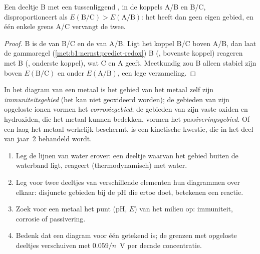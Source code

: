 \begin{proposition}\label{prop:b1:e-ph-diagrams:disproportionation-criterion}
Een deeltje B met een tussenliggend , in de koppels A/B en
B/C, disproportioneert als $E(\mathrm{B}/\mathrm{C}) > E(\mathrm{A}/\mathrm{B})$:
het heeft dan geen eigen gebied, en één enkele grens A/C vervangt de
twee.
\end{proposition}

\begin{proof}
B is de  van B/C en de  van A/B. Ligt het koppel B/C
boven A/B, dan laat de gammaregel (\cref{met:b1:nernst:predict-redox}) B
(, bovenste koppel) reageren met B (, onderste koppel),
wat C en A geeft. Meetkundig zou B alleen stabiel zijn boven
$E(\mathrm{B}/\mathrm{C})$ en onder $E(\mathrm{A}/\mathrm{B})$, een lege
verzameling.
\end{proof}

\begin{definition}\label{def:b1:e-ph-diagrams:corrosion-domains}
In het diagram van een metaal is het gebied van het metaal zelf zijn
\emph{immuniteitsgebied} (het kan niet
geoxideerd worden); de gebieden van zijn opgeloste ionen vormen het
\emph{corrosiegebied}; de gebieden van zijn vaste
oxiden en hydroxiden, die het metaal kunnen bedekken, vormen het
\emph{passiveringsgebied}. Of een laag het
metaal werkelijk beschermt, is een kinetische kwestie, die in het deel
van jaar~2 behandeld wordt.
\end{definition}

\begin{method}\label{met:b1:e-ph-diagrams:read}
\begin{enumerate}
  \item Leg de lijnen van water erover: een deeltje waarvan het gebied
        buiten de waterband ligt, reageert (thermodynamisch) met water.
  \item Leg voor twee deeltjes van verschillende elementen hun diagrammen
        over elkaar: disjuncte gebieden bij de pH die ertoe doet,
        betekenen een reactie.
  \item Zoek voor een metaal het punt (pH, $E$) van het milieu op:
        immuniteit, corrosie of passivering.
  \item Bedenk dat een diagram voor één  getekend is; de
        grenzen met opgeloste deeltjes verschuiven met $0.059/n$~V per
        decade concentratie.
\end{enumerate}
\end{method}

